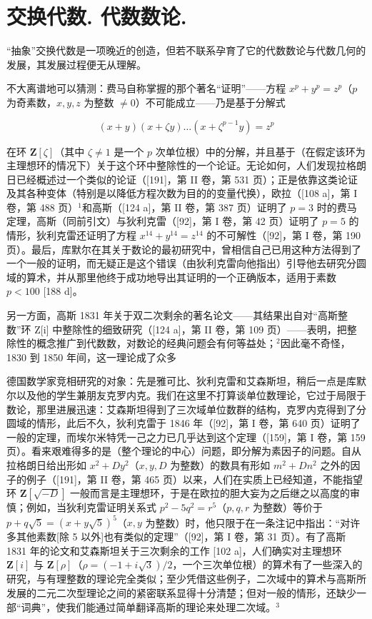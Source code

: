 \chapter{交换代数. 代数数论.}

“抽象”交换代数是一项晚近的创造，但若不联系孕育了它的代数数论与代数几何的发展，其发展过程便无从理解。

不大离谱地可以猜测：费马自称掌握的那个著名“证明”——方程 \(x^{p} + y^{p} = z^{p}\)（\(p\) 为奇素数，\(x, y, z\) 为整数 \(\neq 0\)）不可能成立——乃是基于分解式

\[
(x + y) (x + \zeta y) \dots (x + \zeta^ {p - 1} y) = z ^ {p}
\]

在环 \(\mathbf{Z}[\zeta]\)（其中 \(\zeta \neq 1\) 是一个 \(p\) 次单位根）中的分解，并且基于（在假定该环为主理想环的情况下）关于这个环中整除性的一个论证。无论如何，人们发现拉格朗日已经概述过一个类似的论证（{[}191{]}，第 II 卷，第 531 页）；正是依靠这类论证及其各种变体（特别是以降低方程次数为目的的变量代换），欧拉（{[}108 a{]}，第 I 卷，第 488 页）\(^{1}\)和高斯（{[}124 a{]}，第 II 卷，第 387 页）证明了 \(p = 3\) 时的费马定理，高斯（同前引文）与狄利克雷（{[}92{]}，第 I 卷，第 42 页）证明了 \(p = 5\) 的情形，狄利克雷还证明了方程 \(x^{14} + y^{14} = z^{14}\) 的不可解性（{[}92{]}，第 I 卷，第 190 页）。最后，库默尔在其关于数论的最初研究中，曾相信自己已用这种方法得到了一个一般的证明，而无疑正是这个错误（由狄利克雷向他指出）引导他去研究分圆域的算术，并从那里他终于成功地导出其证明的一个正确版本，适用于素数 \(p < 100\) {[}188 d{]}。

另一方面，高斯 1831 年关于双二次剩余的著名论文——其结果出自对“高斯整数”环 Z{[}i{]} 中整除性的细致研究（{[}124 a{]}，第 II 卷，第 109 页）——表明，把整除性的概念推广到代数数，对数论的经典问题会有何等益处；\(^{2}\)因此毫不奇怪，1830 到 1850 年间，这一理论成了众多

德国数学家竞相研究的对象：先是雅可比、狄利克雷和艾森斯坦，稍后一点是库默尔以及他的学生兼朋友克罗内克。我们在这里不打算谈单位数理论，它过于局限于数论，那里进展迅速：艾森斯坦得到了三次域单位数群的结构，克罗内克得到了分圆域的情形，此后不久，狄利克雷于 1846 年（{[}92{]}，第 I 卷，第 640 页）证明了一般的定理，而埃尔米特凭一己之力已几乎达到这个定理（{[}159{]}，第 I 卷，第 159 页）。看来艰难得多的是（整个理论的中心）问题，即分解为素因子的问题。自从拉格朗日给出形如 \(x^{2} + Dy^{2}\)（\(x, y, D\) 为整数）的数具有形如 \(m^{2} + Dn^{2}\) 之外的因子的例子（{[}191{]}，第 II 卷，第 465 页）以来，人们在实质上已经知道，不能指望环 \(\mathbf{Z}[\sqrt{-D}]\) 一般而言是主理想环，于是在欧拉的胆大妄为之后继之以高度的审慎；例如，当狄利克雷证明关系式 \(p^{2} - 5q^{2} = r^{5}\)（\(p, q, r\) 为整数）等价于 \(p + q\sqrt{5} = (x + y\sqrt{5})^{5}\)（\(x, y\) 为整数）时，他只限于在一条注记中指出：“对许多其他素数{[}除 5 以外{]}也有类似的定理”（{[}92{]}，第 I 卷，第 31 页）。有了高斯 1831 年的论文和艾森斯坦关于三次剩余的工作 {[}102 a{]}，人们确实对主理想环 \(\mathbf{Z}[i]\) 与 \(\mathbf{Z}[\rho]\)（\(\rho = (-1 + i\sqrt{3})/2\)，一个三次单位根）的算术有了一些深入的研究，与有理整数的理论完全类似；至少凭借这些例子，二次域中的算术与高斯所发展的二元二次型理论之间的紧密联系显得十分清楚；但对一般的情形，还缺少一部“词典”，使我们能通过简单翻译高斯的理论来处理二次域。\(^{3}\)

